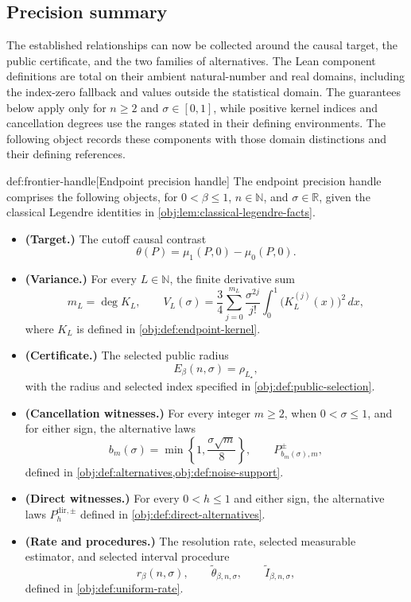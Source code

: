 \documentclass[11pt]{article}
\begin{document}
\subsection{Precision summary}

The established relationships can now be collected around the causal target, the public certificate, and the two families of alternatives. The Lean component definitions are total on their ambient natural-number and real domains, including the index-zero fallback and values outside the statistical domain. The guarantees below apply only for \(n\ge2\) and \(\sigma\in[0,1]\), while positive kernel indices and cancellation degrees use the ranges stated in their defining environments. The following object records these components with those domain distinctions and their defining references.

\begin{remarkv}{def:frontier-handle}[Endpoint precision handle]
The endpoint precision handle comprises the following objects, for \(0<\beta\le1\), \(n\in\mathbb N\), and \(\sigma\in\mathbb R\), given the classical Legendre identities in \cref{obj:lem:classical-legendre-facts}.
\begin{itemize}
\item \textbf{(Target.)} The cutoff causal contrast
\[
\theta(P)=\mu_1(P,0)-\mu_0(P,0).
\]
\item \textbf{(Variance.)} For every \(L\in\mathbb N\), the finite derivative sum
\[
m_L=\deg K_L,\qquad
V_L(\sigma)=\frac34\sum_{j=0}^{m_L}
\frac{\sigma^{2j}}{j!}
\int_0^1\bigl(K_L^{(j)}(x)\bigr)^2\,dx,
\]
where \(K_L\) is defined in \cref{obj:def:endpoint-kernel}.
\item \textbf{(Certificate.)} The selected public radius
\[
E_\beta(n,\sigma)=\rho_{L_\star},
\]
with the radius and selected index specified in \cref{obj:def:public-selection}.
\item \textbf{(Cancellation witnesses.)} For every integer \(m\ge2\), when \(0<\sigma\le1\), and for either sign, the alternative laws
\[
b_m(\sigma)=\min\left\{1,\frac{\sigma\sqrt m}{8}\right\},
\qquad
P^\pm_{b_m(\sigma),m},
\]
defined in \cref{obj:def:alternatives,obj:def:noise-support}.
\item \textbf{(Direct witnesses.)} For every \(0<h\le1\) and either sign, the alternative laws \(P_h^{\mathrm{dir},\pm}\) defined in \cref{obj:def:direct-alternatives}.
\item \textbf{(Rate and procedures.)} The resolution rate, selected measurable estimator, and selected interval procedure
\[
r_\beta(n,\sigma),\qquad
\widetilde\theta_{\beta,n,\sigma},\qquad
\widetilde I_{\beta,n,\sigma},
\]
defined in \cref{obj:def:uniform-rate}.
\end{itemize}
\end{remarkv}
\end{document}
